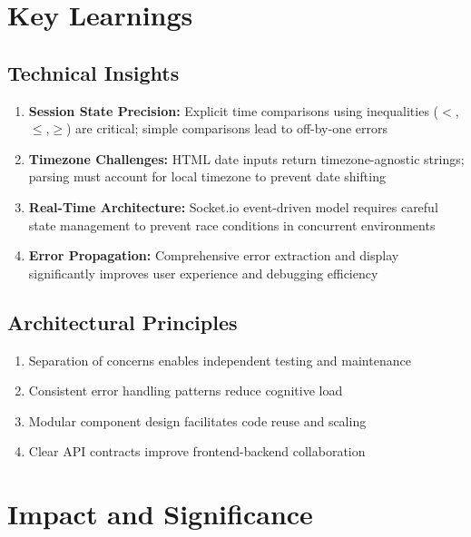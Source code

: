 \documentclass[12pt,a4paper]{report}
\begin{document}
\section{Key Learnings}

\subsection{Technical Insights}

\begin{enumerate}[left=0pt]
  \item \textbf{Session State Precision:} Explicit time comparisons using inequalities ($<$,$\leq$,$\geq$) are critical; simple comparisons lead to off-by-one errors
  
  \item \textbf{Timezone Challenges:} HTML date inputs return timezone-agnostic strings; parsing must account for local timezone to prevent date shifting
  
  \item \textbf{Real-Time Architecture:} Socket.io event-driven model requires careful state management to prevent race conditions in concurrent environments
  
  \item \textbf{Error Propagation:} Comprehensive error extraction and display significantly improves user experience and debugging efficiency
\end{enumerate}

\subsection{Architectural Principles}

\begin{enumerate}[left=0pt]
  \item Separation of concerns enables independent testing and maintenance
  \item Consistent error handling patterns reduce cognitive load
  \item Modular component design facilitates code reuse and scaling
  \item Clear API contracts improve frontend-backend collaboration
\end{enumerate}

\section{Impact and Significance}
\end{document}
